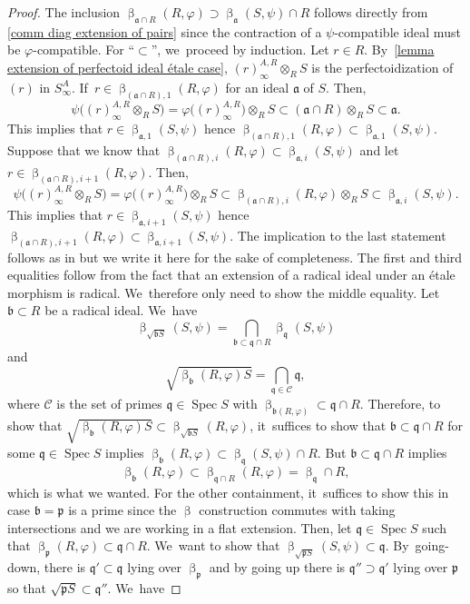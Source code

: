 \documentclass[11pt]{article}
\let\autoref\cref
\theoremstyle{plain}
\theoremstyle{definition}
\numberwithin{equation}{theorem}
\let\tensor\otimes
\newcommand{\fra}{\mathfrak{a}}
\newcommand{\frab}{\mathfrak{b}}
\newcommand{\p}{\mathfrak{p}}
\newcommand{\q}{\mathfrak{q}}
\DeclareMathOperator{\Spec}{{Spec}}
\newcommand{\ps}{\p S}
\renewcommand{\phi}{\varphi}
\newcommand{\rphi}{(R,\phi)}
\newcommand{\spsi}{(S,\psi)}
\newcommand{\pS}{\p S}
\newcommand{\safty}{S^A_\infty}
\begin{document}
\begin{proof}
The inclusion $\upbeta_{\fra\cap R}\rphi \supset \upbeta_\fra\spsi\cap R $ follows directly from \autoref{comm diag extension of pairs} since the contraction of a $\psi$-compatible ideal must be $\phi$-compatible. For ``$\subset$'', we~proceed by induction. Let $r\in R$. By~\autoref{lemma extension of perfectoid ideal étale case}, $(r)^{A,R}_\infty \tensor_{R} S$ is the perfectoidization of $(r)$ in $\safty$. If~$r\in \upbeta_{(\fra\cap R),1}\rphi$ for an ideal $\fra$ of $S$.
Then,\vspace*{-3pt}
\[
\psi\bigl(\left(r\right)^{A,R}_\infty \tensor_{R} S\bigr) =\phi\bigl( \left(r\right)^{A,R}_\infty\bigr) \tensor_{R} S \subset (\fra \cap R) \tensor_{R} S \subset \fra.
\]
This implies that $r\in \upbeta_{\fra,1}\spsi$ hence
$\upbeta_{(\fra\cap R),1}\rphi \subset \upbeta_{\fra,1}\spsi$. Suppose that we know that $\upbeta_{(\fra\cap R),i}\rphi \subset \upbeta_{\fra,i}\spsi$ and let $r\in \upbeta_{(\fra\cap R), i+1}\rphi$. Then,\vspace*{-3pt}
\[
\psi\bigl(\left(r\right)^{A,R}_\infty \tensor_{R} S\bigr) =\phi\bigl( \left(r\right)^{A,R}_\infty\bigr) \tensor_{R} S \subset \upbeta_{(\fra\cap R),i}\rphi \tensor_R S \subset \upbeta_{\fra,i}\spsi.
\]
This implies that $r\in \upbeta_{\fra, i+1}\spsi$ hence
$\upbeta_{(\fra\cap R),i+1}\rphi \subset \upbeta_{\fra,i+1}\spsi$.
The implication to the last statement follows as in \cite[Def.-Prop.\,5.5]{CarvajalFayolleTameRamificationCFPS} but we write it here for the sake of completeness. The first and third equalities follow from the fact that an extension of a radical ideal under an étale morphism is radical. We~therefore only need to show the middle equality.
Let $\frab\subset R$ be a radical ideal. We~have\vspace*{-3pt}
\[
\upbeta_{\sqrt{\frab S}}\spsi=\bigcap_{\frab\subset \q\cap R}\upbeta_\q\spsi
\]
and\vspace*{-5pt}
\[
\sqrt{\upbeta_\frab\rphi S}=\bigcap_{\q\in \mathcal{C}} \q,
\]
where $\mathcal{C}$ is the set of primes $\q\in \Spec S$ with $\upbeta_{\frab\rphi}\subset \q\cap R$. Therefore, to show that $\sqrt{\upbeta_\frab\rphi S}\subset \upbeta_{\sqrt{\frab S}}\rphi$, it~suffices to show that $\frab\subset \q\cap R$ for some $\q\in \Spec S$ implies $\upbeta_{\frab}\rphi\subset \upbeta_\q\spsi \cap R$. But $\frab\subset \q\cap R$ implies\vspace*{-3pt}
\[
\upbeta_\frab\rphi\subset\upbeta_{\q\cap R}\rphi=\upbeta_{\q}\cap R,
\]
which is what we wanted. For the other containment, it~suffices to show this in case $\frab=\p$ is a prime since the $\upbeta$ construction commutes with taking intersections and we are working in a flat extension. Then, let $\q\in \Spec S$ such that $\upbeta_\p\rphi\subset \q\cap R$. We~want to show that $\upbeta_{\sqrt{\pS}}\spsi \subset \q$. By~going-down, there is $\q'\subset \q$ lying over $\upbeta_\p$ and by going up there is $\q''\supset \q'$ lying over $\p$ so that $\sqrt{\ps}\subset \q''$. We~have\vspace*{-3pt}

\end{proof}
\end{document}
